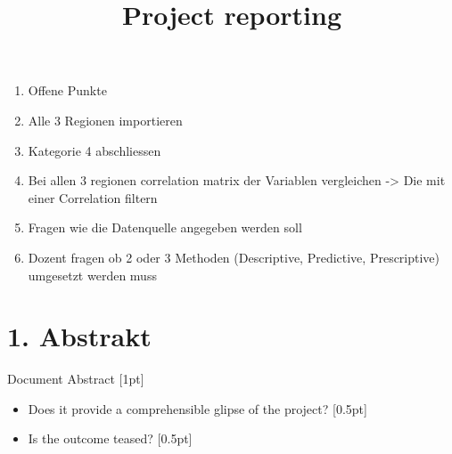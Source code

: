 \documentclass[
  journal,
]{IEEEtran}%
\title{Project reporting}
\author{

}
\providecommand{\tightlist}{%
  \setlength{\itemsep}{0pt}\setlength{\parskip}{0pt}}\usepackage{longtable,booktabs,array}
\begin{document}


\maketitle


%

\ifdefined\Shaded\renewenvironment{Shaded}{\begin{tcolorbox}[enhanced, interior hidden, frame hidden, sharp corners, borderline west={3pt}{0pt}{shadecolor}, breakable, boxrule=0pt]}{\end{tcolorbox}}\fi

\begin{enumerate}
\def\labelenumi{\arabic{enumi}.}
\setcounter{enumi}{-1}
\tightlist
\item
  Offene Punkte
\item
  Alle 3 Regionen importieren
\item
  Kategorie 4 abschliessen
\item
  Bei allen 3 regionen correlation matrix der Variablen vergleichen
  -\textgreater{} Die mit einer Correlation filtern
\item
  Fragen wie die Datenquelle angegeben werden soll
\item
  Dozent fragen ob 2 oder 3 Methoden (Descriptive, Predictive,
  Prescriptive) umgesetzt werden muss
\end{enumerate}

\hypertarget{abstrakt}{%
\section{1. Abstrakt}\label{abstrakt}}

Document Abstract {[}1pt{]}

\begin{itemize}
\item
  Does it provide a comprehensible glipse of the project? {[}0.5pt{]}
\item
  Is the outcome teased? {[}0.5pt{]}
\end{itemize}
\end{document}
